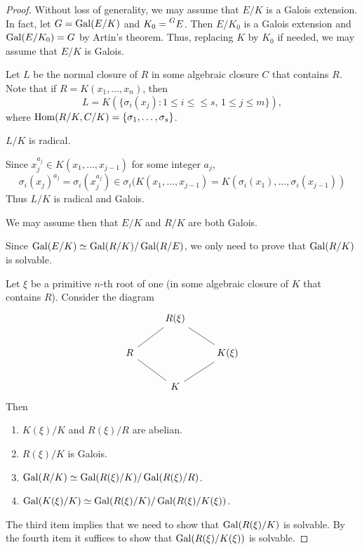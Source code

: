 \begin{proof}
    Without loss of generality, 
    we may assume that $E/K$ is a Galois extension. In fact, 
    let $G=\operatorname{Gal}(E/K)$ and $K_0=\prescript{G}{}{E}$. Then
    $E/K_0$ is a Galois extension and $\operatorname{Gal}(E/K_0)=G$ by Artin's theorem. 
    Thus, replacing $K$ by $K_0$ if needed, we may assume that
    $E/K$ is Galois. 
    
    Let $L$ be the normal closure of $R$ in some
    algebraic closure $C$ that contains $R$. Note that 
    if $R=K(x_1,\dots,x_n)$, then 
    \[
    L=K(\{\sigma_i(x_j):1\leq i\leq\leq s,\,1\leq j\leq m\}),
    \]
    where $\operatorname{Hom}(R/K,C/K)=\{\sigma_1,\dots,\sigma_s\}$. 
    
    \begin{claim}
        $L/K$ is radical. 
    \end{claim}
    
    Since $x_j^{a_j}\in K(x_1,\dots,x_{j-1})$ for some integer $a_j$, 
    \[
    \sigma_i(x_j)^{a_j}=\sigma_i\left(x_j^{a_j}\right)\in\sigma_i(K(x_1,\dots,x_{j-1})=K(\sigma_i(x_1),\dots,\sigma_i(x_{j-1}))
    \]
    Thus $L/K$ is radical and Galois. 
    
    We may assume then that $E/K$ and $R/K$ are both Galois. 
    
    Since $\operatorname{Gal}(E/K)\simeq\operatorname{Gal}(R/K)/\operatorname{Gal}(R/E)$, we only need
    to prove that $\operatorname{Gal}(R/K)$ is solvable. 
    
    Let $\xi$ be a primitive $n$-th root of one (in some algebraic closure
    of $K$ that contains $R$). Consider the diagram
    \[
    \begin{tikzcd}
	& {R(\xi)} \\
	R && {K(\xi)} \\
	& K
	\arrow[no head, from=1-2, to=2-3]
	\arrow[no head, from=1-2, to=2-1]
	\arrow[no head, from=2-1, to=3-2]
	\arrow[no head, from=3-2, to=2-3]
    \end{tikzcd}
    \]
    Then
    \begin{enumerate}
        \item $K(\xi)/K$ and $R(\xi)/R$ are abelian.
        \item $R(\xi)/K$ is Galois.
        \item $\operatorname{Gal}(R/K)\simeq\operatorname{Gal}(R(\xi)/K)/\operatorname{Gal}(R(\xi)/R)$. 
        \item $\operatorname{Gal}(K(\xi)/K)\simeq\operatorname{Gal}(R(\xi)/K)/\operatorname{Gal}(R(\xi)/K(\xi))$. 
    \end{enumerate}
    The third item implies that we need to 
    show that $\operatorname{Gal}(R(\xi)/K)$ is solvable. By the fourth item
    it suffices to show that $\operatorname{Gal}(R(\xi)/K(\xi))$ is solvable. 
    

\end{proof}

